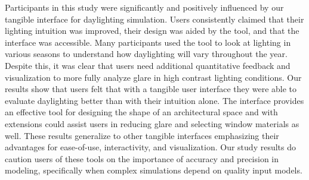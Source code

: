 \documentclass[preprint]{elsarticle}
\begin{document}
Participants in this study were significantly and positively
influenced by our tangible interface for daylighting simulation.
Users consistently claimed that their lighting intuition was improved,
their design was aided by the tool, and that the interface was
accessible.  Many participants used the tool to look at lighting in
various seasons to understand how daylighting will vary throughout the
year.  Despite this, it was clear that users need additional
quantitative feedback and visualization to more fully analyze glare in
high contrast lighting conditions.  Our results show that users felt
that with a tangible user interface they were able to evaluate
daylighting better than with their intuition alone.  The interface
provides an effective tool for designing the shape of an architectural
space and with extensions could assist users in reducing glare and
selecting window materials as well.  These results generalize to other
tangible interfaces emphasizing their advantages for ease-of-use,
interactivity, and visualization.  Our study results do caution users
of these tools on the importance of accuracy and precision in
modeling, specifically when complex simulations depend on quality
input models.





%
\end{document}
